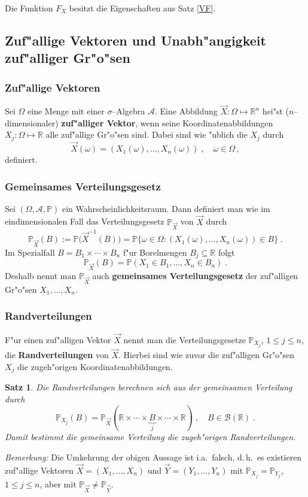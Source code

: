 \documentclass[ngerman,draft,parskip=half,twoside]{scrartcl}
\newtheorem{thm}{Satz}[section]
\newcommand*{\R}{\mathbb{R}}      %
\newcommand*{\Algeb}{\mathcal{A}}   %
\newcommand*{\BorelM}{\mathcal{B}}  %
\newcommand*{\WKM}{\mathbb{P}}      %
\begin{document}
Die Funktion $F_X$ besitzt die Eigenschaften aus Satz \ref{VF}.

\subsection{Zuf"allige Vektoren und Unabh"angigkeit zuf"alliger Gr"o"sen}
\subsubsection{Zuf"allige Vektoren}
Sei $\Omega$ eine Menge mit einer $\sigma$--Algebra $\Algeb$. Eine Abbildung $\vec X \colon \Omega\mapsto\R^n$
hei"st ($n$--dimensionaler) \textbf{zuf"alliger Vektor}, wenn seine Koordinatenabbildungen
$X_j \colon\Omega\mapsto \R$ alle zuf"allige Gr"o"sen sind. Dabei sind wie "ublich die $X_j$ durch
$$
\vec X(\omega)=(X_1(\omega),\ldots,X_n(\omega))\;,\quad \omega\in\Omega\,,
$$
definiert.

\subsubsection{Gemeinsames Verteilungsgesetz}
Sei $(\Omega,\Algeb,\WKM)$ ein Wahrscheinlichkeitsraum. Dann definiert
man wie im eindimensionalen Fall das Verteilungsgesetz $\WKM_{\vec X}$ von $\vec X$
durch
$$
\WKM_{\vec X}(B):=\WKM\big(\vec X^{-1}(B)\big)=\WKM\{\omega\in\Omega : (X_1(\omega),\ldots,X_n(\omega))\in B\}\;.
$$
Im Spezialfall $B=B_1\times\cdots\times B_n$ f"ur Borelmengen $B_j\subseteq\R$ folgt
$$
\WKM_{\vec X}(B)=\WKM(X_1\in B_1,\ldots, X_n\in B_n)\;.
$$
Deshalb nennt man $\WKM_{\vec X}$ auch \textbf{gemeinsames Verteilungsgesetz} der zuf"alligen
Gr"o"sen $X_1,\ldots,X_n$.
\subsubsection{Randverteilungen}
F"ur einen zuf"alligen Vektor $\vec X$ nennt man die Verteilungsgesetze $\WKM_{X_j}$, $1\le j\le n$,
die \textbf{Randverteilungen} von $\vec X$. Hierbei sind wie zuvor die zuf"alligen Gr"o"sen $X_j$ die
zugeh"origen Koordinatenabbildungen.
\begin{thm}
Die Randverteilungen berechnen sich aus der gemeinsamen Verteilung durch
$$
\WKM_{X_j}(B)= \WKM_{\vec X}(\R\times\cdots\times \underbrace{B}_j\times\cdots\times\R)\;,\quad B\in\BorelM(\R)\;.
$$
Damit bestimmt die gemeinsame Verteilung die zugeh"origen Randverteilungen.
\end{thm}
\textit{Bemerkung:} Die Umkehrung der obigen Aussage ist i.a.~falsch, d.\,h.~es existieren zuf"allige
Vektoren $\vec X=(X_1,\ldots,X_n)$ und $\vec Y=(Y_1,\ldots, Y_n)$ mit $\WKM_{X_j}=\WKM_{Y_j}$,
$1\le j\le n$, aber mit $\WKM_{\vec X}\not=\WKM_{\vec Y}$.
\end{document}
